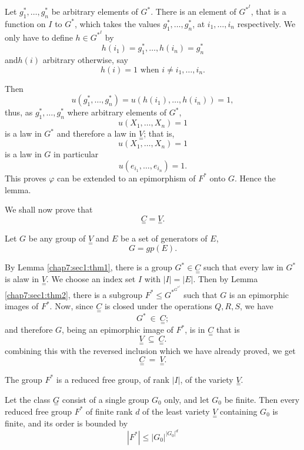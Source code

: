 Let $g^*_1,  \ldots,g^*_n$ be arbitrary elements of $G^*$. There is an
element of $G^{*^{I}}$, that is a function on $I$ to $G^*$, which
takes the values $g^*_1, \ldots, g^*_n$, at $i_1, \ldots, i_n$
respectively. We only have to define $h \in G^{*^{I}}$ by  
$$
h (i_1) = g^*_1, \ldots, h(i_n) = g^*_n 
$$
and\pageoriginale $h(i)$ arbitrary otherwise, say
$$
h(i) = 1 \text{ when } i \neq i_1, \ldots, i_n.
$$

Then
$$
u(g^*_1, \ldots, g^*_n)  = u(h(i_1), \ldots, h (i_n )) = 1,  
$$
thus, as $ g^*_1, \ldots, g^*_n $ where arbitrary elements of $G^*$,
$$
u (X_1, \ldots,X_n ) = 1
$$
is a law in $G^*$ and therefore a law in $ \underset{=}{V} $; that is,
$$
u( X_1, \ldots, X_n) = 1
$$
is a law in $G$ in particular
$$
u(e_{i_{1}}, \ldots, e_{i_{n}} ) = 1.
$$
This proves $\varphi$ can be extended to  an epimorphism of $F^*$ onto
$G$. Hence the lemma. 

\begin{proofofthm*}[2]%
  We shall now prove that
  $$
  \underset{=}{C} = \underset{=}{V}. 
  $$
\end{proofofthm*}

Let $G$ be any group of $\underset{=}{V}$ and $E$ be a set of
generators of $E$, 
$$
G = gp(E).
$$

By Lemma \ref{chap7:sec1:thm1}, there is a group $G^* \in
\underset{=}{C} $ such 
that every law in $G^*$ is  a\pageoriginale law in $\underset{=}{V}$. We choose  an
index set $I$ with $|I| = |E|$. Then by Lemma \ref{chap7:sec1:thm2}, there is a subgroup
$F^* \leq G^{*^{G^{*^{I}}}}$ such that $G$ is an epimorphic images of
$F^*$. Now, since $\underset{=}{C}$ is closed under the operations
$Q,R,S$, we have 
$$
G^* ~\in ~\underset{=}{C};
$$
and therefore $G$, being an epimorphic image of $F^*$, is in
$\underset{=}{C}$ that is 
$$
\underset{=}{V}~ \subseteq ~\underset{=}{C}.
$$
combining this with the reversed inclusion which we have already\break
proved, we get 
$$
\underset{=}{C}~ =~ \underset{=}{V}.
$$

\setcounter{corollary}{0}
\begin{corollary}\label{chap7:sec1:coro1}%
  The group $F^*$ is a reduced free group, of rank $|I|$, of the
  variety $\underset{=}{V}$. 
\end{corollary}

\begin{corollary}\label{chap7:sec1:coro2}%
  Let the class $\underset{=}{G}$ consist of a single group $G_0$
  only, and let $G_0$ be finite. Then every reduced free group $F^*$
  of  finite rank  $d$ of the  least variety $\underset{=}{V}$
  containing  $G_0$ is finite,  and its order is bounded by 
  $$
  |F^*|\leq|G_0|^{|G_0|^{d}}
  $$
\end{corollary}

